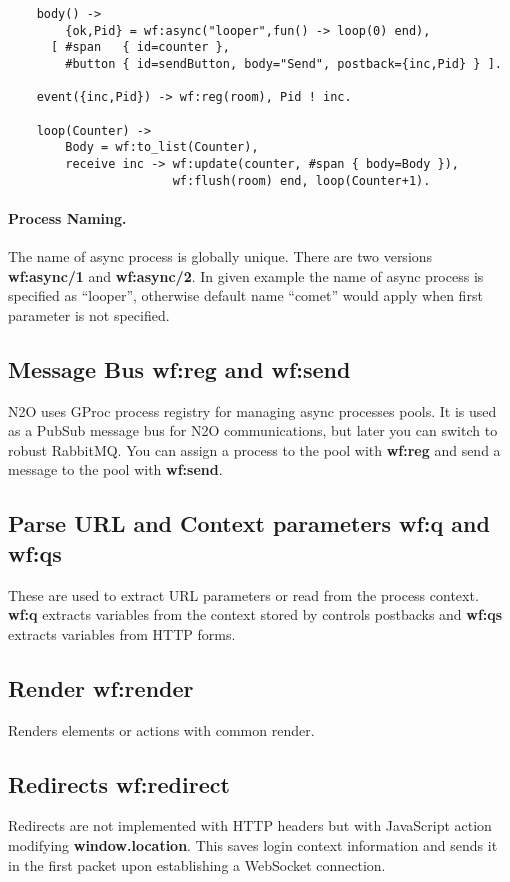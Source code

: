 \vspace{1\baselineskip}
\begin{lstlisting}
    body() ->
        {ok,Pid} = wf:async("looper",fun() -> loop(0) end),
      [ #span   { id=counter },
        #button { id=sendButton, body="Send", postback={inc,Pid} } ].

    event({inc,Pid}) -> wf:reg(room), Pid ! inc.

    loop(Counter) ->
        Body = wf:to_list(Counter),
        receive inc -> wf:update(counter, #span { body=Body }),
                       wf:flush(room) end, loop(Counter+1).
\end{lstlisting}

\paragraph{\bf Process Naming.} The name of async process is globally unique. There are two
versions {\bf wf:async/1} and {\bf wf:async/2}. In given example
the name of async process is specified as ``looper'', otherwise default name
``comet'' would apply when first parameter is not specified.
\subsection{Message Bus {\bf wf:reg} and {\bf wf:send}}
N2O uses GProc process registry for managing async processes pools.
It is used as a PubSub message bus for N2O communications, but later you can switch to robust RabbitMQ.
You can assign a process to the pool with {\bf wf:reg} and send a message to the pool with {\bf wf:send}.

\subsection{Parse URL and Context parameters {\bf wf:q} and {\bf wf:qs}}
These are used to extract URL parameters or read from the process context. {\bf wf:q} extracts variables
from the context stored by controls postbacks and {\bf wf:qs} extracts variables from HTTP forms.

\subsection{Render {\bf wf:render}}
Renders elements or actions with common render.

\subsection{Redirects {\bf wf:redirect}}
Redirects are not implemented with HTTP headers but with JavaScript action modifying {\bf window.location}.
This saves login context information and sends it in the first packet upon establishing a WebSocket connection.

